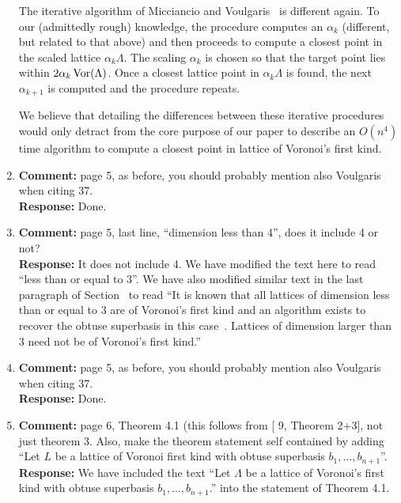 \documentclass[a4paper,10pt]{article}
\begin{document}
\begin{enumerate}
The iterative algorithm of Micciancio and Voulgaris~\cite{MicciancioVoulgaris_deterministic_jv_2013} is different again.  To our (admittedly rough) knowledge, the procedure computes an $\alpha_k$ (different, but related to that above) and then proceeds to compute a closest point in the scaled lattice $\alpha_k \Lambda$.  The scaling $\alpha_k$ is chosen so that the target point lies within $2\alpha_k \operatorname{Vor}(\Lambda)$.  Once a closest lattice point in $\alpha_k\Lambda$ is found, the next $\alpha_{k+1}$ is computed and the procedure repeats.

We believe that detailing the differences between these iterative procedures would only detract from the core purpose of our paper to describe an $O(n^4)$ time algorithm to compute a closest point in lattice of Voronoi's first kind.

\item\textbf{Comment:}  
page 5, as before, you should probably mention also Voulgaris when citing 37. 
\\\textbf{Response:}
Done.

\item\textbf{Comment:}  
page 5, last line, ``dimension less than 4'', does it include 4 or not? 
\\\textbf{Response:}
It does not include 4.  We have modified the text here to read ``less than or equal to $3$''. We have also modified similar text in the last paragraph of Section~ to read ``It is known that all lattices of dimension less than or equal to 3 are of Voronoi's first kind and an algorithm exists to recover the obtuse superbasis in this case~\cite{SPLAG}.  Lattices of dimension larger than 3 need not be of Voronoi's first kind.''

\item\textbf{Comment:}  
page 5, as before, you should probably mention also Voulgaris when citing 37. 
\\\textbf{Response:}
Done.

\item\textbf{Comment:}  
page 6, Theorem 4.1 (this follows from [ 9, Theorem 2+3], not just theorem 3. 
Also, make the theorem statement self contained by adding ``Let $L$ be a lattice of Voronoi first kind with obtuse superbasis $b_1,\dots,b_{n+1}$''. 
\\\textbf{Response:}
We have included the text ``Let $\Lambda$ be a lattice of Voronoi's first kind with obtuse superbasis $b_1,\dots,b_{n+1}$.'' into the statement of Theorem 4.1.


\end{enumerate}
\end{document}
